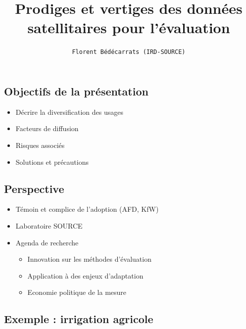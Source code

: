 \documentclass[
  letterpaper,
  DIV=11,
  numbers=noendperiod]{scrartcl}
\title{Prodiges et vertiges des données satellitaires pour l'évaluation}
\author{\texttt{Florent\ Bédécarrats\ (IRD-SOURCE)}}
\date{}
\providecommand{\tightlist}{%
  \setlength{\itemsep}{0pt}\setlength{\parskip}{0pt}}\usepackage{longtable,booktabs,array}
\begin{document}
\maketitle
\ifdefined\Shaded\renewenvironment{Shaded}{\begin{tcolorbox}[boxrule=0pt, breakable, frame hidden, borderline west={3pt}{0pt}{shadecolor}, interior hidden, enhanced, sharp corners]}{\end{tcolorbox}}\fi

\hypertarget{objectifs-de-la-pruxe9sentation}{%
\subsection{Objectifs de la
présentation}\label{objectifs-de-la-pruxe9sentation}}

\begin{itemize}
\item
  Décrire la diversification des usages
\item
  Facteurs de diffusion
\item
  Risques associés
\item
  Solutions et précautions
\end{itemize}

\hypertarget{perspective}{%
\subsection{Perspective}\label{perspective}}

\begin{itemize}
\item
  Témoin et complice de l'adoption (AFD, KfW)
\item
  Laboratoire SOURCE
\item
  Agenda de recherche

  \begin{itemize}
  \tightlist
  \item
    Innovation sur les méthodes d'évaluation
  \item
    Application à des enjeux d'adaptation
  \item
    Economie politique de la mesure
  \end{itemize}
\end{itemize}

\hypertarget{exemple-irrigation-agricole}{%
\subsection{Exemple : irrigation
agricole}\label{exemple-irrigation-agricole}}
\end{document}
